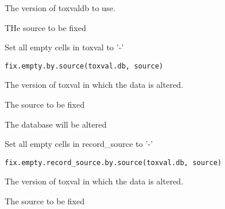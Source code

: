 \documentclass[letterpaper]{book}
\begin{document}
%
\begin{Arguments}
\begin{ldescription}
\item[\code{toxval.db}] The version of toxvaldb to use.

\item[\code{source}] THe source to be fixed
\end{ldescription}
\end{Arguments}
%
\begin{Description}\relax
Set all empty cells in toxval to '-'
\end{Description}
%
\begin{Usage}
\begin{verbatim}
fix.empty.by.source(toxval.db, source)
\end{verbatim}
\end{Usage}
%
\begin{Arguments}
\begin{ldescription}
\item[\code{toxval.db}] The version of toxval in which the data is altered.

\item[\code{source}] The source to be fixed
\end{ldescription}
\end{Arguments}
%
\begin{Value}
The database will be altered
\end{Value}
%
\begin{Description}\relax
Set all empty cells in record\_source to '-'
\end{Description}
%
\begin{Usage}
\begin{verbatim}
fix.empty.record_source.by.source(toxval.db, source)
\end{verbatim}
\end{Usage}
%
\begin{Arguments}
\begin{ldescription}
\item[\code{toxval.db}] The version of toxval in which the data is altered.

\item[\code{source}] The source to be fixed
\end{ldescription}
\end{Arguments}
\end{document}

